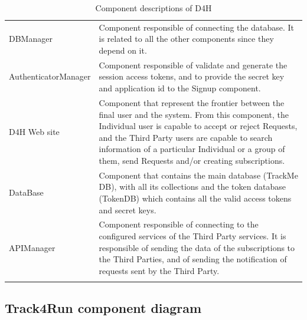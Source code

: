\documentclass[a4paper, hidelinks, 12pt]{report}
\begin{document}
\begin{longtable}{l p{}}
			DBManager & Component responsible of connecting the database. It is related to all the other components since they depend on it.\\
			
			AuthenticatorManager & Component responsible of validate and generate the session access tokens, and to provide the secret key and application id to the Signup component.\\
			
			D4H Web site & Component that represent the frontier between the final user and the system. From this component, the Individual user is capable to accept or reject Requests, and the Third Party users are capable to search information of a particular Individual or a group of them, send Requests and/or creating subscriptions.\\
			
			DataBase & Component that contains the main database (TrackMe DB), with all its collections and the token database (TokenDB) which contains all the valid access tokens and secret keys.\\
			
			APIManager & Component responsible of connecting to the configured services of the Third Party services. It is responsible of sending the data of the subscriptions to the Third Parties, and of sending the notification of requests sent by the Third Party.\\
			
			\hline
			\caption{Component descriptions of D4H}
			\label{table:d4h_component_descriptions}
		\end{longtable}
			
		\subsection{Track4Run component diagram}
\end{document}
